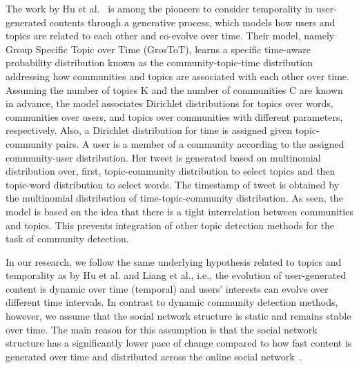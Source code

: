 \documentclass[sigconf]{acmart}
\begin{document}
The work by Hu et al.~\cite{DBLP:conf/aaai/HuYC14} is among the pioneers to consider temporality in user-generated contents through  a  generative  process, which  models  how  users  and  topics  are  related to  each  other  and  co-evolve  over  time.   Their  model, namely Group Specific Topic over Time (GrosToT), learns a  specific time-aware probability distribution known as the community-topic-time distribution addressing how communities and  topics are associated with each  other over time. Assuming the number of topics K and the number of communities C are known in advance, the model associates Dirichlet distributions for topics over words, communities over users, and topics over communities with different parameters, respectively. Also, a Dirichlet distribution for time is assigned given topic-community pairs. A user is a member of a community according to the assigned community-user distribution. Her tweet is generated based on multinomial distribution over, first, topic-community distribution to select topics and then topic-word distribution to select words. The timestamp of tweet is obtained by the multinomial distribution of time-topic-community distribution. As seen, the model is based on the idea that there is a tight interrelation between communities and topics. This prevents integration of other topic detection methods for the task of community detection. 

{\color{red} In our research, we follow the same underlying hypothesis related to topics and temporality as by Hu et al. and Liang et al., i.e., the evolution of user-generated content is dynamic over time (temporal) and users' interests can evolve over different time intervals. In contrast to dynamic community detection methods, however, we assume that the social network structure is static and remains stable over time.  The main reason for this assumption is that the social network structure has a significantly lower pace of change compared to how fast content is generated over time and distributed across the online social network~\cite{Myers:2014:BDT:2566486.2568043}.} 


 
\end{document}
